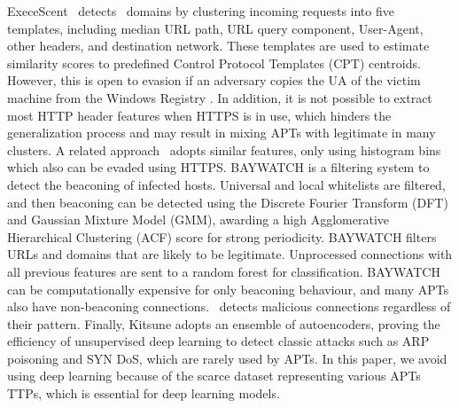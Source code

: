 ExeceScent~\cite{nelms2013execscent} detects \cc\ domains by clustering incoming requests into five templates, including median URL path, URL query component, User-Agent, other headers, and destination network. 
%
These templates are used to estimate similarity scores to predefined Control Protocol Templates (CPT) centroids. 
%
However, this is open to evasion if an adversary copies the UA of the victim machine from the Windows Registry \cite{bortolameotti2017decanter}. 
%
In addition, it is not possible to extract most HTTP header features when HTTPS is in use, which hinders the generalization process and may result in mixing APTs with legitimate in many clusters. 
%
A related approach~\cite{bartos2016optimized} adopts similar features, only using histogram bins which also can be evaded using HTTPS. 
%
%
BAYWATCH \cite{hu2016baywatch} is a filtering system to detect the beaconing of infected hosts. 
%
Universal and local whitelists are filtered, and then beaconing can be detected using the Discrete Fourier Transform (DFT) and Gaussian Mixture Model (GMM), awarding a high Agglomerative Hierarchical Clustering (ACF) score for strong periodicity.
%
BAYWATCH filters URLs and domains that are likely to be legitimate. 
%
Unprocessed connections with all previous features are sent to a random forest for classification.
%
BAYWATCH can be computationally expensive for only beaconing behaviour, and many APTs also have non-beaconing connections. 
%
\earlycrow\ detects malicious connections regardless of their pattern.
%
Finally, Kitsune \cite{mirsky2018kitsune} adopts an ensemble of autoencoders, proving the efficiency of unsupervised deep learning to detect classic attacks such as ARP poisoning and SYN DoS, which are rarely used by APTs. 
%
In this paper, we avoid using deep learning because of the scarce dataset representing various APTs TTPs, which is essential for deep learning models. 


